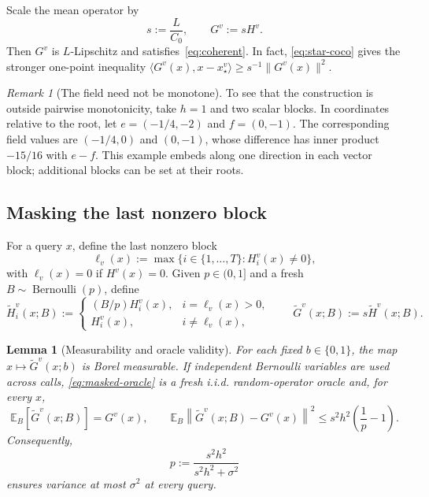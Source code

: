 \documentclass[11pt,a4paper]{article}
\newcommand{\E}{\mathbb E}
\newcommand{\norm}[1]{\left\lVert #1\right\rVert}
\newtheorem{lemma}[theorem]{Lemma}
\theoremstyle{definition}
\theoremstyle{remark}
\newtheorem{remark}[theorem]{Remark}
\begin{document}
Scale the mean operator by
\begin{equation}
 s:=\frac{L}{C_0},
 \qquad
 G^v:=sH^v.
 \label{eq:scale}
\end{equation}
Then $G^v$ is $L$-Lipschitz and satisfies~\eqref{eq:coherent}.
In fact, \eqref{eq:star-coco} gives the stronger one-point inequality
$\langle G^v(x),x-x_\star^v\rangle\ge s^{-1}\|G^v(x)\|^2$.

\begin{remark}[The field need not be monotone]\label{rem:nonmonotone}
To see that the construction is outside pairwise monotonicity, take $h=1$
and two scalar blocks. In coordinates relative to the root, let
$e=(-1/4,-2)$ and $f=(0,-1)$. The corresponding field values are
$(-1/4,0)$ and $(0,-1)$, whose difference has inner product $-15/16$
with $e-f$. This example embeds along one direction in each vector block;
additional blocks can be set at their roots.
\end{remark}

\subsection{Masking the last nonzero block}

For a query $x$, define the last nonzero block
\begin{equation}
 \ell_v(x):=\max\{i\in\{1,\ldots,T\}:H_i^v(x)\ne0\},
 \label{eq:ell}
\end{equation}
with $\ell_v(x)=0$ if $H^v(x)=0$.  Given $p\in(0,1]$ and a fresh $B\sim\operatorname{Bernoulli}(p)$, define
\begin{equation}
 \widetilde H_i^v(x;B):=
 \begin{cases}
 (B/p)H_i^v(x),&i=\ell_v(x)>0,\\
 H_i^v(x),&i\ne\ell_v(x),
 \end{cases}
 \qquad
 \widetilde G^v(x;B):=s\widetilde H^v(x;B).
 \label{eq:masked-oracle}
\end{equation}

\begin{lemma}[Measurability and oracle validity]\label{lem:oracle}
For each fixed $b\in\{0,1\}$, the map $x\mapsto\widetilde G^v(x;b)$ is Borel measurable.  If independent Bernoulli variables are used across calls, \eqref{eq:masked-oracle} is a fresh i.i.d. random-operator oracle and, for every $x$,
\begin{equation}
 \E_B[\widetilde G^v(x;B)]=G^v(x),
 \qquad
 \E_B\norm{\widetilde G^v(x;B)-G^v(x)}^2
 \le s^2h^2\left(\frac1p-1\right).
 \label{eq:oracle-valid}
\end{equation}
Consequently,
\begin{equation}
 p:=\frac{s^2h^2}{s^2h^2+\sigma^2}
 \label{eq:p}
\end{equation}
ensures variance at most $\sigma^2$ at every query.
\end{lemma}
\end{document}
